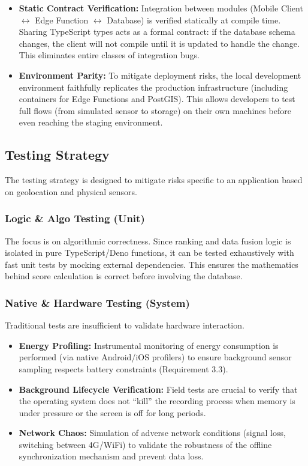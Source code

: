 \begin{itemize}
    \item \textbf{Static Contract Verification:} Integration between modules (Mobile Client $\leftrightarrow$ Edge Function $\leftrightarrow$ Database) is verified statically at compile time. Sharing TypeScript types acts as a formal contract: if the database schema changes, the client will not compile until it is updated to handle the change. This eliminates entire classes of integration bugs.
    \item \textbf{Environment Parity:} To mitigate deployment risks, the local development environment faithfully replicates the production infrastructure (including containers for Edge Functions and PostGIS). This allows developers to test full flows (from simulated sensor to storage) on their own machines before even reaching the staging environment.
\end{itemize}

\subsection{Testing Strategy}
The testing strategy is designed to mitigate risks specific to an application based on geolocation and physical sensors.

\subsubsection{Logic \& Algo Testing (Unit)}
The focus is on algorithmic correctness. Since ranking and data fusion logic is isolated in pure TypeScript/Deno functions, it can be tested exhaustively with fast unit tests by mocking external dependencies. This ensures the mathematics behind score calculation is correct before involving the database.

\subsubsection{Native \& Hardware Testing (System)}
Traditional tests are insufficient to validate hardware interaction.

\begin{itemize}
    \item \textbf{Energy Profiling:} Instrumental monitoring of energy consumption is performed (via native Android/iOS profilers) to ensure background sensor sampling respects battery constraints (Requirement 3.3).
    \item \textbf{Background Lifecycle Verification:} Field tests are crucial to verify that the operating system does not ``kill'' the recording process when memory is under pressure or the screen is off for long periods.
    \item \textbf{Network Chaos:} Simulation of adverse network conditions (signal loss, switching between 4G/WiFi) to validate the robustness of the offline synchronization mechanism and prevent data loss.
\end{itemize}